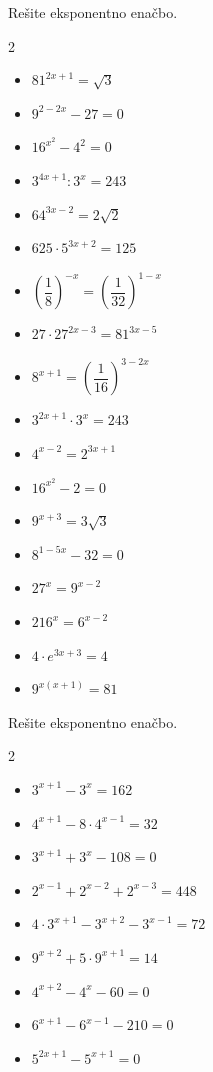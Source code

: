     \begin{naloga}
        Rešite eksponentno enačbo.
        \begin{multicols}{2}
            
        \begin{itemize}
            \item $81^{2x+1}=\sqrt{3}$
            \item $9^{2-2x}-27=0$
            \item $16^{x^2}-4^2=0$
            \item $3^{4x+1}:3^x=243$
            \item $64^{3x-2}=2\sqrt{2}$
            \item $625\cdot 5^{3x+2}=125$
            \item $\left(\dfrac{1}{8}\right)^{-x}=\left(\dfrac{1}{32}\right)^{1-x}$
            \item $27\cdot 27^{2x-3}=81^{3x-5}$
            \item $8^{x+1}=\left(\dfrac{1}{16}\right)^{3-2x}$
            \item $3^{2x+1}\cdot 3^x=243$
            \item $4^{x-2}=2^{3x+1}$
            \item $16^{x^2}-2=0$
            \item $9^{x+3}=3\sqrt{3}$
            \item $8^{1-5x}-32=0$
            \item $27^x=9^{x-2}$
            \item $216^x=6^{x-2}$
            \item $4\cdot e^{3x+3}=4$
            \item $9^{x(x+1)}=81$
        \end{itemize}
        \end{multicols}

    \end{naloga}


    \begin{naloga}
        Rešite eksponentno enačbo.
        \begin{multicols}{2}
            
        \begin{itemize}
            \item $3^{x+1}-3^x=162$
            \item $4^{x+1}-8\cdot 4^{x-1}=32$
            \item $3^{x+1}+3^x-108=0$
            \item $2^{x-1}+2^{x-2}+2^{x-3}=448$
            \item $4\cdot 3^{x+1}-3^{x+2}-3^{x-1}=72$
            \item $9^{x+2}+5\cdot 9^{x+1}=14$
            \item $4^{x+2}-4^x-60=0$
            \item $6^{x+1}-6^{x-1}-210=0$
            \item $5^{2x+1}-5^{x+1}=0$
        \end{itemize}
        \end{multicols}

    \end{naloga}





